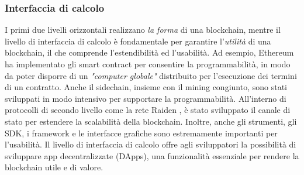 \subsubsection{Interfaccia di calcolo}
I primi due livelli orizzontali realizzano \emph{la forma} di una blockchain, mentre il livello di interfaccia di calcolo è fondamentale per garantire l'\emph{utilità} di una blockchain, il che comprende l'estendibilità ed l'usabilità. Ad esempio, Ethereum ha implementato gli smart contract per consentire la programmabilità, in modo da poter disporre di un \emph{"computer globale"} distribuito per l'esecuzione dei termini di un contratto. Anche il sidechain, insieme con il mining congiunto, sono stati sviluppati in modo intensivo per supportare la programmabilità. All'interno di protocolli di secondo livello come la rete Raiden \cite{c25}, è stato sviluppato il canale di stato per estendere la scalabilità della blockchain. Inoltre, anche gli strumenti, gli SDK, i framework e le interfacce grafiche sono estremamente importanti per l'usabilità. Il livello di interfaccia di calcolo offre agli sviluppatori la possibilità di sviluppare app decentralizzate (DApps), una funzionalità essenziale per rendere la blockchain utile e di valore.

